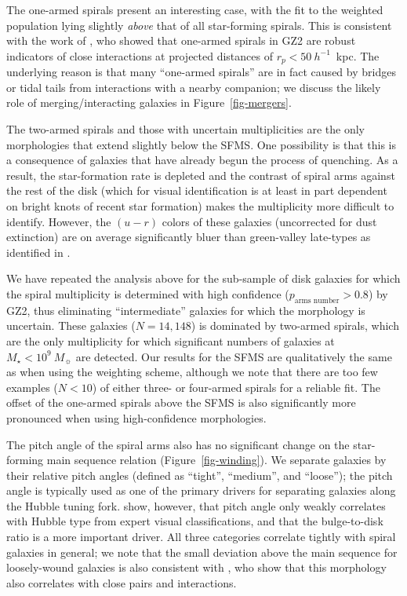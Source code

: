 \documentclass{emulateapj}
\begin{document}
The one-armed spirals present an interesting case, with the fit to the weighted population lying slightly \emph{above} that of all star-forming spirals. This is consistent with the work of \citet{cas13}, who showed that one-armed spirals in GZ2 are robust indicators of close interactions at projected distances of $r_p < 50~h^{-1}$~kpc. The underlying reason is that many ``one-armed spirals'' are in fact caused by bridges or tidal tails from interactions with a nearby companion; we discuss the likely role of merging/interacting galaxies in Figure~\ref{fig-mergers}. 

The two-armed spirals and those with uncertain multiplicities are the only morphologies that extend slightly below the SFMS. One possibility is that this is a consequence of galaxies that have already begun the process of quenching. As a result, the star-formation rate is depleted and the contrast of spiral arms against the rest of the disk (which for visual identification is at least in part dependent on bright knots of recent star formation) makes the multiplicity more difficult to identify. However, the $(u-r)$ colors of these galaxies (uncorrected for dust extinction) are on average significantly bluer than green-valley late-types as identified in \citet{sch14}.

We have repeated the analysis above for the sub-sample of disk galaxies for which the spiral multiplicity is determined with high confidence ($p_\textrm{arms~number} > 0.8$) by GZ2, thus eliminating ``intermediate'' galaxies for which the morphology is uncertain. These galaxies ($N=14,148$) is dominated by two-armed spirals, which are the only multiplicity for which significant numbers of galaxies at $M_\star<10^9~M_\sun$ are detected. Our results for the SFMS are qualitatively the same as when using the weighting scheme, although we note that there are too few examples ($N<10$) of either three- or four-armed spirals for a reliable fit. The offset of the one-armed spirals above the SFMS is also significantly more pronounced when using high-confidence morphologies.

The pitch angle of the spiral arms also has no significant change on the star-forming main sequence relation (Figure~\ref{fig-winding}). We separate galaxies by their relative pitch angles (defined as ``tight'', ``medium'', and ``loose''); the pitch angle is typically used as one of the primary drivers for separating galaxies along the Hubble tuning fork. \citet{wil13} show, however, that pitch angle only weakly correlates with Hubble type from expert visual classifications, and that the bulge-to-disk ratio is a more important driver. All three categories correlate tightly with spiral galaxies in general; we note that the small deviation above the main sequence for loosely-wound galaxies is also consistent with \citet{cas13}, who show that this morphology also correlates with close pairs and interactions. 
\end{document}
